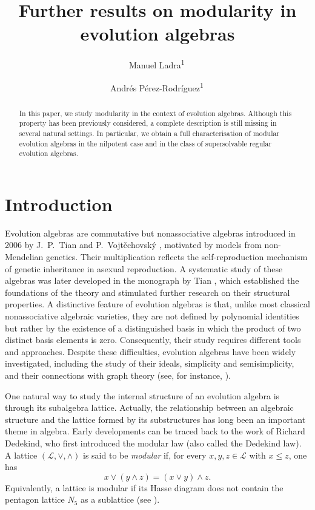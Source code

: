 \documentclass[12pt,reqno]{amsart}
\title[Further results on modularity in evolution algebras]{Further results on modularity in evolution algebras}
\author[M. Ladra]{Manuel Ladra\textsuperscript{1}\,\orcidlink{0000-0002-0543-4508}}
\author[A. Pérez-Rodríguez]{Andrés Pérez-Rodríguez\textsuperscript{1}\,\orcidlink{0009-0007-1095-5328}}
\theoremstyle{plain}%
\theoremstyle{definition}
\theoremstyle{remark}
\numberwithin{equation}{section}
\begin{document}
	
	\begin{abstract}
	In this paper, we study modularity in the context of evolution algebras. Although this property has been previously considered, a complete description is still missing in several natural settings. In particular, we obtain a full characterisation of modular evolution algebras in the nilpotent case and in the class of supersolvable regular evolution algebras.
	\end{abstract}
	


\maketitle

\section{Introduction}

Evolution algebras are commutative but nonassociative algebras introduced in 2006 by J.~P.~Tian and P.~Vojt\v{e}chovsk\'y \cite{TV_06}, motivated by models from non-Mendelian genetics. Their multiplication reflects the self-reproduction mechanism of genetic inheritance in asexual reproduction. A systematic study of these algebras was later developed in the monograph by Tian \cite{Tian_08}, which established the foundations of the theory and stimulated further research on their structural properties. A distinctive feature of evolution algebras is that, unlike most classical nonassociative algebraic varieties, they are not defined by polynomial identities but rather by the existence of a distinguished basis in which the product of two distinct basis elements is zero. Consequently, their study requires different tools and approaches. Despite these difficulties, evolution algebras have been widely investigated, including the study of their ideals, simplicity and semisimplicity, and their connections with graph theory (see, for instance, \cite{BCS_22,CKM_19,CMMT_25,EL_15}). 

One natural way to study the internal structure of an evolution algebra is through its subalgebra lattice. Actually, the relationship between an algebraic structure and the lattice formed by its substructures has long been an important theme in algebra. Early developments can be traced back to the work of Richard Dedekind, who first introduced the modular law (also called the Dedekind law). A lattice $(\mathcal{L},\vee,\wedge)$ is said to be \textit{modular} if, for every $x,y,z\in\mathcal{L}$ with $x\leq z$, one has
\begin{equation}\label{eq:mod}
	x\vee (y\wedge z)= (x\vee y)\wedge z.
\end{equation}
Equivalently, a lattice is modular if its Hasse diagram does not contain the pentagon lattice $N_5$ as a sublattice (see \cite[Theorem~2.1.2]{Gr_98}).
\end{document}
